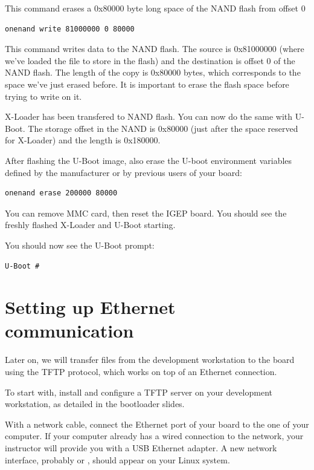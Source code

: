 This command erases a 0x80000 byte long space of the NAND flash from offset 0

\begin{verbatim}
onenand write 81000000 0 80000
\end{verbatim}

This command writes data to the NAND flash. The source is 0x81000000
(where we've loaded the file to store in the flash) and the
destination is offset 0 of the NAND flash. The length of the copy is
0x80000 bytes, which corresponds to the space we've just erased
before. It is important to erase the flash space before trying to
write on it.

X-Loader has been transfered to NAND flash. You can now do the same
with U-Boot.  The storage offset in the NAND is 0x80000 (just after
the space reserved for X-Loader) and the length is 0x180000.

After flashing the U-Boot image, also erase the U-boot environment
variables defined by the manufacturer or by previous users of your
board:

\begin{verbatim}
onenand erase 200000 80000
\end{verbatim}

You can remove MMC card, then reset the IGEP board. You should see the
freshly flashed X-Loader and U-Boot starting.

You should now see the U-Boot prompt:

\begin{verbatim}
U-Boot #
\end{verbatim}

\section{Setting up Ethernet communication}

Later on, we will transfer files from the development workstation to
the board using the TFTP protocol, which works on top of an Ethernet
connection.

To start with, install and configure a TFTP server on your development
workstation, as detailed in the bootloader slides.

With a network cable, connect the Ethernet port of your board to the
one of your computer. If your computer already has a wired connection
to the network, your instructor will provide you with a USB Ethernet
adapter. A new network interface, probably  or ,
should appear on your Linux system.

